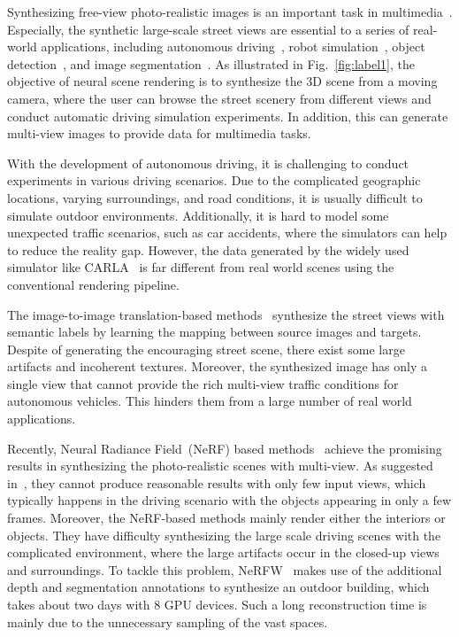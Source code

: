 \documentclass[sigconf]{acmart}
\begin{document}
Synthesizing free-view photo-realistic images is an important task in multimedia~\cite{chen2019multimedia}. Especially, the synthetic large-scale street views are essential to a series of real-world applications, including autonomous driving~\cite{li2019event,kim2013parallel}, robot simulation~\cite{dosovitskiy2017carla,wiriyathammabhum2016computer}, object detection~\cite{zhang2021auto,zhang2021depth,he2021end}, and image segmentation~\cite{ying2021srnet,gao2020lab2pix,tang2020dual}.
As illustrated in Fig.~\ref{fig:label1}, the objective of neural scene rendering is to synthesize the 3D scene from a moving camera, where the user can browse the street scenery from different views and conduct automatic driving simulation experiments. In addition, this can generate multi-view images to provide data for multimedia tasks. 




 



With the development of autonomous driving, it is challenging to conduct experiments in various driving scenarios. Due to the complicated geographic locations, varying surroundings, and road conditions, it is usually difficult to simulate outdoor environments. Additionally, it is hard to model some unexpected traffic scenarios, such as car accidents, where the simulators can help to reduce the reality gap. However, the data generated by the widely used simulator like CARLA~\cite{dosovitskiy2017carla} is far different from real world scenes using the conventional rendering pipeline. 


The image-to-image translation-based methods~\cite{gao2020lab2pix,tang2020dual,isola2017image, tang2020local} synthesize the street views with semantic labels by learning the mapping between source images and targets. Despite of generating the encouraging street scene, there exist some large artifacts and incoherent textures. Moreover, the synthesized image has only a single view that cannot provide the rich multi-view traffic conditions for autonomous vehicles. This hinders them from a large number of real world applications. 


 Recently, Neural Radiance Field~(NeRF) based methods~\cite{zhang2021ners,niemeyer2021giraffe,mildenhall2020NeRF,wang2021ibrnet} achieve the promising results in synthesizing the photo-realistic scenes with multi-view. As suggested in~\cite{kangle2021dsnerf}, they cannot produce reasonable results with only few input views, which typically happens in the driving scenario with the objects appearing in only a few frames. Moreover, the NeRF-based methods mainly render either the interiors or objects. They have difficulty synthesizing the large scale driving scenes with the complicated environment, where the large artifacts occur in the closed-up views and surroundings. To tackle this problem, NeRFW~\cite{martin2021nerf} makes use of the additional depth and segmentation annotations to synthesize an outdoor building, which takes about two days with 8 GPU devices. Such a long reconstruction time is mainly due to the unnecessary sampling of the vast spaces. 
\end{document}
